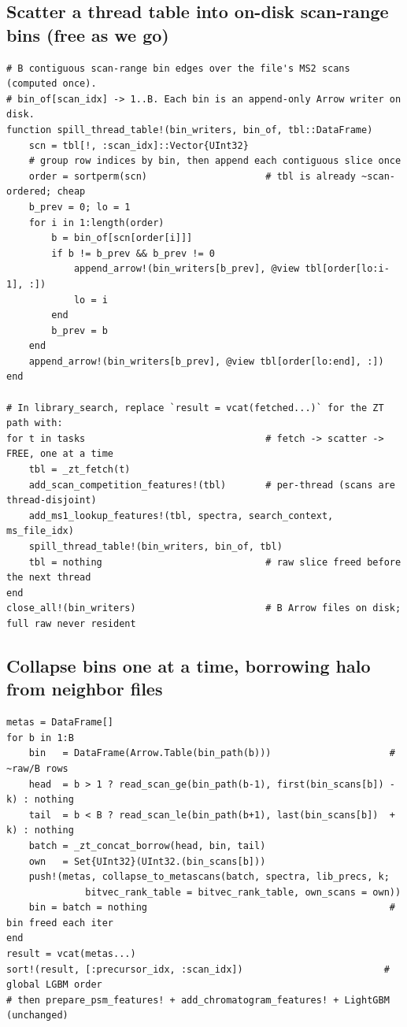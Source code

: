 \documentclass[11pt]{article}
\begin{document}
\subsection{Scatter a thread table into on-disk scan-range bins (free as we go)}
\begin{lstlisting}
# B contiguous scan-range bin edges over the file's MS2 scans (computed once).
# bin_of[scan_idx] -> 1..B. Each bin is an append-only Arrow writer on disk.
function spill_thread_table!(bin_writers, bin_of, tbl::DataFrame)
    scn = tbl[!, :scan_idx]::Vector{UInt32}
    # group row indices by bin, then append each contiguous slice once
    order = sortperm(scn)                     # tbl is already ~scan-ordered; cheap
    b_prev = 0; lo = 1
    for i in 1:length(order)
        b = bin_of[scn[order[i]]]
        if b != b_prev && b_prev != 0
            append_arrow!(bin_writers[b_prev], @view tbl[order[lo:i-1], :])
            lo = i
        end
        b_prev = b
    end
    append_arrow!(bin_writers[b_prev], @view tbl[order[lo:end], :])
end

# In library_search, replace `result = vcat(fetched...)` for the ZT path with:
for t in tasks                                # fetch -> scatter -> FREE, one at a time
    tbl = _zt_fetch(t)
    add_scan_competition_features!(tbl)       # per-thread (scans are thread-disjoint)
    add_ms1_lookup_features!(tbl, spectra, search_context, ms_file_idx)
    spill_thread_table!(bin_writers, bin_of, tbl)
    tbl = nothing                             # raw slice freed before the next thread
end
close_all!(bin_writers)                       # B Arrow files on disk; full raw never resident
\end{lstlisting}

\subsection{Collapse bins one at a time, borrowing halo from neighbor files}
\begin{lstlisting}
metas = DataFrame[]
for b in 1:B
    bin   = DataFrame(Arrow.Table(bin_path(b)))                     # ~raw/B rows
    head  = b > 1 ? read_scan_ge(bin_path(b-1), first(bin_scans[b]) - k) : nothing
    tail  = b < B ? read_scan_le(bin_path(b+1), last(bin_scans[b])  + k) : nothing
    batch = _zt_concat_borrow(head, bin, tail)
    own   = Set{UInt32}(UInt32.(bin_scans[b]))
    push!(metas, collapse_to_metascans(batch, spectra, lib_precs, k;
              bitvec_rank_table = bitvec_rank_table, own_scans = own))
    bin = batch = nothing                                           # bin freed each iter
end
result = vcat(metas...)
sort!(result, [:precursor_idx, :scan_idx])                         # global LGBM order
# then prepare_psm_features! + add_chromatogram_features! + LightGBM (unchanged)
\end{lstlisting}
\end{document}
